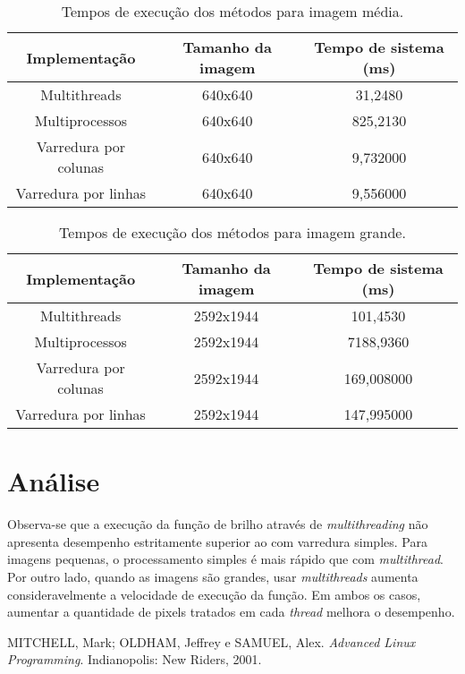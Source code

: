 \documentclass[a4paper, 10pt, conference]{ieeeconf}
\begin{document}
\begin{table}[h]
	\centering
	\caption{Tempos de execução dos métodos para imagem média.}
	\label{tabela3}
	\begin{tabular}{|c|c|c|}
		\hline
		\textbf{Implementação} & \textbf{Tamanho da imagem} & \textbf{Tempo de sistema (ms)} \\ \hline
		Multithreads           & 640x640                    & 31,2480                        \\ \hline
		Multiprocessos         & 640x640                    & 825,2130                       \\ \hline
		Varredura por colunas  & 640x640                    & 9,732000                       \\ \hline
		Varredura por linhas   & 640x640                    & 9,556000                       \\ \hline
	\end{tabular}
\end{table}

\begin{table}[]
	\centering
	\caption{Tempos de execução dos métodos para imagem grande.}
	\label{tabela4}
	\begin{tabular}{|c|c|c|}
		\hline
		\textbf{Implementação} & \textbf{Tamanho da imagem} & \textbf{Tempo de sistema (ms)} \\ \hline
		Multithreads           & 2592x1944                  & 101,4530                       \\ \hline
		Multiprocessos         & 2592x1944                  & 7188,9360                      \\ \hline
		Varredura por colunas  & 2592x1944                  & 169,008000                     \\ \hline
		Varredura por linhas   & 2592x1944                  & 147,995000                     \\ \hline
	\end{tabular}
\end{table}


\section{Análise}


Observa-se que a execução da função de brilho através de \textit{multithreading} não apresenta desempenho estritamente superior ao com varredura simples. Para imagens pequenas, o processamento simples é mais rápido que com \textit{multithread}. Por outro lado, quando as imagens são grandes, usar \textit{multithreads} aumenta consideravelmente a velocidade de execução da função. Em ambos os casos, aumentar a quantidade de pixels tratados em cada \textit{thread} melhora o desempenho.


\begin{thebibliography}{99}

 MITCHELL, Mark; OLDHAM, Jeffrey e SAMUEL, Alex. \textit{Advanced Linux Programming}. Indianopolis: New Riders, 2001.

\end{thebibliography}
\end{document}
